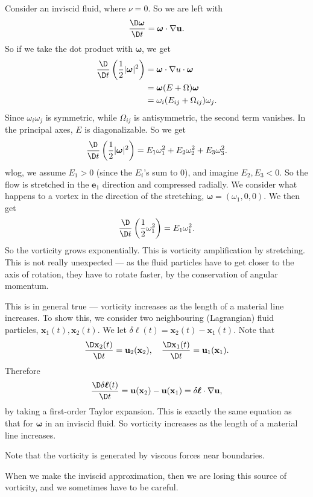 \documentclass[a4paper]{article}
\begin{document}
Consider an inviscid fluid, where $\nu = 0$. So we are left with
\[
  \frac{\D \boldsymbol\omega}{\D t} = \boldsymbol\omega \cdot \nabla \mathbf{u}.
\]
So if we take the dot product with $\boldsymbol\omega$, we get
\begin{align*}
  \frac{\D}{\D t}\left(\frac{1}{2} |\boldsymbol\omega|^2\right) &= \boldsymbol\omega \cdot \nabla u \cdot \boldsymbol\omega\\
  &= \boldsymbol\omega (E + \Omega) \boldsymbol\omega\\
  &= \omega_i (E_{ij} + \Omega_{ij}) \omega_j.
\end{align*}
Since $\omega_i \omega_j$ is symmetric, while $\Omega_{ij}$ is antisymmetric, the second term vanishes. In the principal axes, $E$ is diagonalizable. So we get
\[
  \frac{\D}{\D t} \left(\frac{1}{2} |\boldsymbol\omega|^2\right) = E_1 \omega_1^2 + E_2 \omega_2^2 + E_3 \omega_3^2.
\]
wlog, we assume $E_1 > 0$ (since the $E_i$'s sum to $0$), and imagine $E_2, E_3 < 0$. So the flow is stretched in the $\mathbf{e}_1$ direction and compressed radially. We consider what happens to a vortex in the direction of the stretching, $\boldsymbol\omega = (\omega_1, 0, 0)$. We then get
\[
  \frac{\D}{\D t}\left(\frac{1}{2}\omega_1^2\right) = E_1 \omega_1^2.
\]
So the vorticity grows exponentially. This is vorticity amplification by stretching. This is not really unexpected --- as the fluid particles have to get closer to the axis of rotation, they have to rotate faster, by the conservation of angular momentum.

This is in general true --- vorticity increases as the length of a material line increases. To show this, we consider two neighbouring (Lagrangian) fluid particles, $\mathbf{x}_1(t), \mathbf{x}_2(t)$. We let $\delta\boldsymbol\ell(t) = \mathbf{x}_2(t) - \mathbf{x}_1(t)$. Note that
\[
  \frac{\D \mathbf{x}_2(t)}{\D t} = \mathbf{u}_2(\mathbf{x}_2),\quad \frac{\D \mathbf{x}_1(t)}{\D t} = \mathbf{u}_1(\mathbf{x}_1).
\]
Therefore
\[
  \frac{\D \delta \boldsymbol\ell(t)}{\D t} = \mathbf{u}(\mathbf{x}_2) - \mathbf{u}(\mathbf{x}_1) = \delta \boldsymbol\ell \cdot \nabla \mathbf{u},
\]
by taking a first-order Taylor expansion. This is exactly the same equation as that for $\boldsymbol\omega$ in an inviscid fluid. So vorticity increases as the length of a material line increases.

Note that the vorticity is generated by viscous forces near boundaries.
\begin{center}
\end{center}
When we make the inviscid approximation, then we are losing this source of vorticity, and we sometimes have to be careful.
\end{document}
